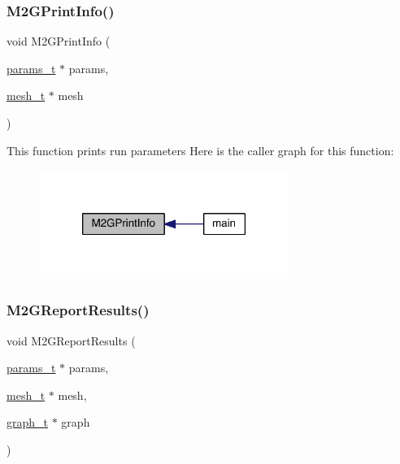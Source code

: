 \subsubsection{\texorpdfstring{M2\+G\+Print\+Info()}{M2GPrintInfo()}}
{\footnotesize\ttfamily void M2\+G\+Print\+Info (\begin{DoxyParamCaption}\item[{\hyperlink{a00706}{params\+\_\+t} $\ast$}]{params,  }\item[{\hyperlink{a00738}{mesh\+\_\+t} $\ast$}]{mesh }\end{DoxyParamCaption})}

This function prints run parameters Here is the caller graph for this function\+:\nopagebreak
\begin{figure}[H]
\begin{center}
\leavevmode
\includegraphics[width=230pt]{a00317_ac1de26132f220c8648448493e1c701c3_icgraph}
\end{center}
\end{figure}
\mbox{\label{a00317_a1830d2cc04f766d0cf9f16cbf81d0a4b}} 
\subsubsection{\texorpdfstring{M2\+G\+Report\+Results()}{M2GReportResults()}}
{\footnotesize\ttfamily void M2\+G\+Report\+Results (\begin{DoxyParamCaption}\item[{\hyperlink{a00706}{params\+\_\+t} $\ast$}]{params,  }\item[{\hyperlink{a00738}{mesh\+\_\+t} $\ast$}]{mesh,  }\item[{\hyperlink{a00734}{graph\+\_\+t} $\ast$}]{graph }\end{DoxyParamCaption})}

